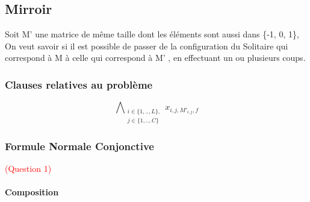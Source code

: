 \documentclass[utf8]{article}
\begin{document}
\begin{comment}
Soit si x$_{i,j-1,1}$, x$_{i,j,1}$ et x$_{i,j+1,0}$, alors on peut jouer un coup tel que x$_{i,j-1,0}$, x$_{i,j,0}$ et x$_{i,j+1,1}$
\newline

\begin{clips-code}
    ((($x_{i,j-1,1} \land \neg x_{i,j+1,1}$) $\lor$ ($ x_{i,j-1,0} \land \neg x_{i,j+1,0}$)) $\land$ (($x_{i-1,j,1} \land \neg x_{i+1,j,1}$) $\lor$ ($ x_{i-1,j,0} \land \negx_{i+1,j,0}$)))
    
    $\land$ ($x_{i,j,1}$) 
------------------------------------

    ((($ x_{i,j-1,1,s}  \land x_{i,j+1,0,s} \land x_{i,j-1,0,s+1} \land x_{i,j+1,1,s+1} $) $\lor$ ($ x_{i,j-1,0,s} \land x_{i,j+1,1,s} \land x_{i,j-1,1,s+1} \land x_{i,j+1,0,s+1}$)) 
    $\lor$
    (($x_{i-1,j,1,s} \land x_{i+1,j,0,s} \land x_{i-1,j,0,s+1} \land x_{i+1,j,1,s+1}$) $\lor$ ($ x_{i-1,j,0,s} \land x_{i+1,j,1,s} \land x_{i-1,j,1,s+1} \land x_{i+1,j,0,s+1}$)))
    $\land$ ($x_{i,j,1,s} \land x_{i,j,0,s}$) 

\end{clips-code}

\end{comment}

\subsection{ Mirroir }
Soit M' une matrice de même taille
dont les éléments sont aussi dans \{-1, 0, 1\},
On veut savoir si il est possible de passer de
la configuration du Solitaire
qui correspond à M 
à celle qui correspond à M'
, en effectuant un ou
plusieurs coups. 

\subsubsection{Clauses relatives au problème}

\[
\mathop{\mathbb{\bigwedge}}_{\substack{i \in \{1,..,L\},\\ j \in \{1,..,C\}}} x_{i,j, M'_{i,j}, f}
\]

\subsubsection{Formule Normale Conjonctive}
\textcolor{red}{(Question 1)}
\paragraph{Composition}
\end{document}
